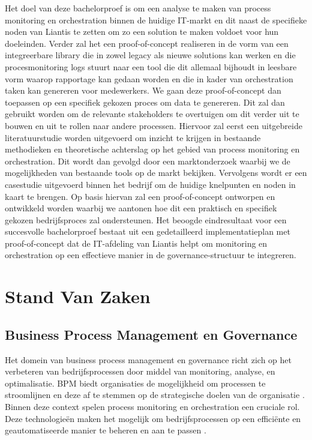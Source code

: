 Het doel van deze bachelorproef is om een analyse te maken van process monitoring en orchestration binnen de huidige IT-markt en dit naast de specifieke noden van Liantis te zetten om zo een solution te maken voldoet voor hun doeleinden. Verder zal het een proof-of-concept realiseren in de vorm van een integreerbare library die in zowel legacy als nieuwe solutions kan werken en die procesmonitoring logs stuurt naar een tool die dit allemaal bijhoudt in leesbare vorm waarop rapportage kan gedaan worden en die in kader van orchestration taken kan genereren voor medewerkers. We gaan deze proof-of-concept dan toepassen op een specifiek gekozen proces om data te genereren. Dit zal dan gebruikt worden om de relevante stakeholders te overtuigen om dit verder uit te bouwen en uit te rollen naar andere processen.  Hiervoor zal eerst een uitgebreide literatuurstudie worden uitgevoerd om inzicht te krijgen in bestaande methodieken en theoretische achterslag op het gebied van process monitoring en orchestration. Dit wordt dan gevolgd door een marktonderzoek waarbij we de mogelijkheden van bestaande tools op de markt bekijken. Vervolgens wordt er een casestudie uitgevoerd binnen het bedrijf om de huidige knelpunten en noden in kaart te brengen. Op basis hiervan zal een proof-of-concept ontworpen en ontwikkeld worden waarbij we aantonen hoe dit een praktisch en specifiek gekozen bedrijfsproces zal ondersteunen. Het beoogde eindresultaat voor een succesvolle bachelorproef bestaat uit een gedetailleerd implementatieplan met proof-of-concept dat de IT-afdeling van Liantis helpt om monitoring en orchestration op een effectieve manier in de governance-structuur te integreren.


\section{Stand Van Zaken}%
\label{sec:stand_van_zaken}
\subsection{Business Process Management en Governance}

Het domein van business process management en governance richt zich op het verbeteren van bedrijfsprocessen door middel van monitoring, analyse, en optimalisatie. BPM biedt organisaties de mogelijkheid om processen te stroomlijnen en deze af te stemmen op de strategische doelen van de organisatie \autocite{Dumas2018}. Binnen deze context spelen process monitoring en orchestration een cruciale rol. Deze technologieën maken het mogelijk om bedrijfsprocessen op een efficiënte en geautomatiseerde manier te beheren en aan te passen \autocite{Weske2019}.

